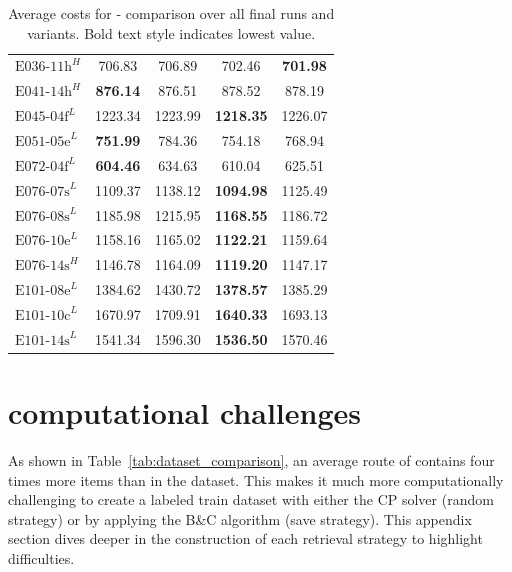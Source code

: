 \begin{table}
\begin{tabular}{lcccc}
		$\text{E036-11h}^H$ & 706.83                      & 706.89          & 702.46           & \textbf{701.98} \\
		$\text{E041-14h}^H$ & \textbf{876.14}             & 876.51          & 878.52           & 878.19          \\
		$\text{E045-04f}^L$ & 1223.34                     & 1223.99         & \textbf{1218.35} & 1226.07         \\
		$\text{E051-05e}^L$ & \textbf{751.99}             & 784.36          & 754.18           & 768.94          \\
		$\text{E072-04f}^L$ & \textbf{604.46}             & 634.63          & 610.04           & 625.51          \\
		$\text{E076-07s}^L$ & 1109.37                     & 1138.12         & \textbf{1094.98} & 1125.49         \\
		$\text{E076-08s}^L$ & 1185.98                     & 1215.95         & \textbf{1168.55} & 1186.72         \\
		$\text{E076-10e}^L$ & 1158.16                     & 1165.02         & \textbf{1122.21} & 1159.64         \\
		$\text{E076-14s}^H$ & 1146.78                     & 1164.09         & \textbf{1119.20} & 1147.17         \\
		$\text{E101-08e}^L$ & 1384.62                     & 1430.72         & \textbf{1378.57} & 1385.29         \\
		$\text{E101-10c}^L$ & 1670.97                     & 1709.91         & \textbf{1640.33} & 1693.13         \\
		$\text{E101-14s}^L$ & 1541.34                     & 1596.30         & \textbf{1536.50} & 1570.46         \\
		\bottomrule
	\end{tabular}
	\caption[Average costs for \gendreauDataSetText - comparison over all final runs and variants.]
	{Average costs for \gendreauDataSetText - comparison over all final runs and variants. Bold text style indicates lowest value.}
	\label{tab:final_mean_comparison}
\end{table}
\clearpage
\section{\krebsADataSetText computational challenges}
\label{app:sec:krebs_computationally_challenges}

As shown in Table~\ref{tab:dataset_comparison}, an average route of \krebsADataSetText contains four times more items than
in the \gendreauDataSetText dataset. This makes it much more computationally challenging to create a labeled train dataset with either
the \gls{CP} solver (random strategy) or by applying the B\&C algorithm (save strategy). This appendix section dives deeper in
the construction of each retrieval strategy to highlight difficulties.

